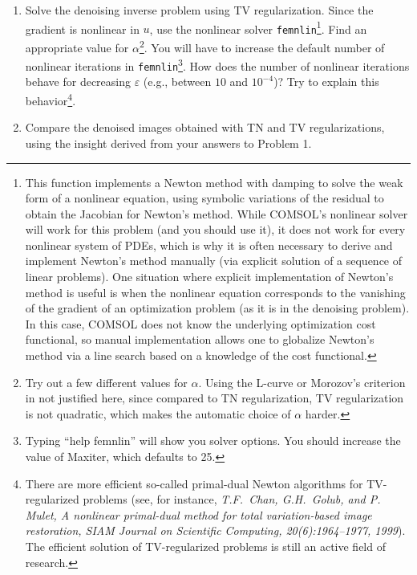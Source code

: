 \documentclass[12pt]{article}
\begin{document}
\begin{enumerate}
\begin{enumerate}
\item Solve the denoising inverse problem using TV
  regularization. Since the gradient is nonlinear in $u$, use the
  nonlinear solver \verb+femnlin+\footnote{This function implements a
    Newton method with damping to solve the weak form of a nonlinear
    equation, using symbolic variations of the residual to obtain the
    Jacobian for Newton's method. While COMSOL's nonlinear solver will
    work for this problem (and you should use it), it does not work
    for every nonlinear system of PDEs, which is why it is often
    necessary to derive and implement Newton's method manually (via
    explicit solution of a sequence of linear problems).  One
    situation where explicit implementation of Newton's method is
    useful is when the nonlinear equation corresponds to the vanishing
    of the gradient of an optimization problem (as it is in the
    denoising problem). In this case, COMSOL does not know the
    underlying optimization cost functional, so manual implementation
    allows one to globalize Newton's method via a line search based on
    a knowledge of the cost functional.}. Find an appropriate value
  for $\alpha$\footnote{Try out a few different values for
    $\alpha$. Using the L-curve or Morozov's criterion in not
    justified here, since compared to TN regularization, TV
    regularization is not quadratic, which makes the automatic choice
    of $\alpha$ harder.}. You will have to increase the default number
  of nonlinear iterations in \verb+femnlin+\footnote{Typing
    ``{\ttfamily help femnlin}'' will show you solver options. You
    should increase the value of {\ttfamily Maxiter}, which defaults
    to 25.}. How does the number of nonlinear iterations behave for
  decreasing $\varepsilon$ (e.g., between $10$ and $10^{-4}$)? Try to
  explain this behavior\footnote{There are more efficient so-called
    primal-dual Newton algorithms for TV-regularized problems (see,
    for instance, {\em T.F.\ Chan, G.H.\ Golub, and P. Mulet,
      A nonlinear primal-dual method for total variation-based image
      restoration, SIAM Journal on Scientific Computing,
      20(6):1964--1977, 1999}). The efficient solution of
    TV-regularized problems is still an active field of research.}.

\item Compare the denoised images obtained with TN and TV
  regularizations, using the insight derived from your answers to
  Problem 1.

\end{enumerate}


\end{enumerate}
\end{document}
